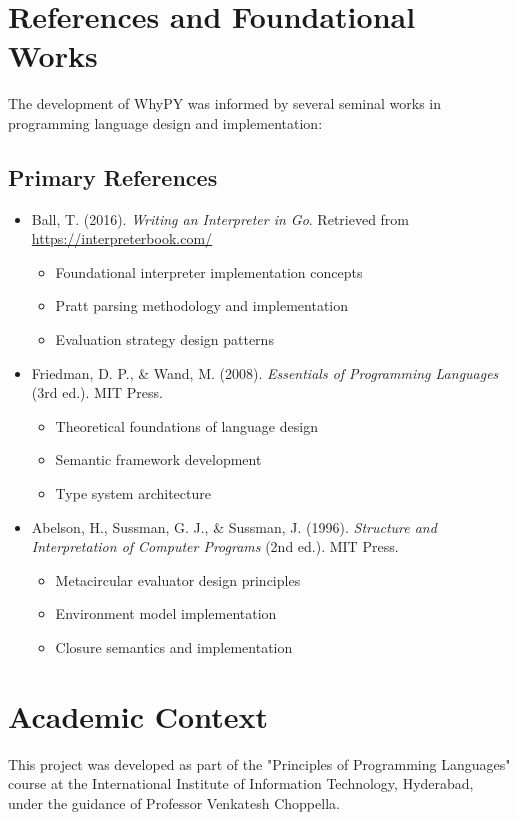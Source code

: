 \documentclass[conference]{IEEEtran}
\begin{document}
\section{References and Foundational Works}
The development of WhyPY was informed by several seminal works in programming language design and implementation:

\subsection{Primary References}
\begin{itemize}
    \item Ball, T. (2016). \textit{Writing an Interpreter in Go}. Retrieved from \url{https://interpreterbook.com/}
    \begin{itemize}
        \item Foundational interpreter implementation concepts
        \item Pratt parsing methodology and implementation
        \item Evaluation strategy design patterns
    \end{itemize}

    \item Friedman, D. P., \& Wand, M. (2008). \textit{Essentials of Programming Languages} (3rd ed.). MIT Press.
    \begin{itemize}
        \item Theoretical foundations of language design
        \item Semantic framework development
        \item Type system architecture
    \end{itemize}

    \item Abelson, H., Sussman, G. J., \& Sussman, J. (1996). \textit{Structure and Interpretation of Computer Programs} (2nd ed.). MIT Press.
    \begin{itemize}
        \item Metacircular evaluator design principles
        \item Environment model implementation
        \item Closure semantics and implementation
    \end{itemize}
\end{itemize}

\section{Academic Context}
This project was developed as part of the "Principles of Programming Languages" course at the International Institute of Information Technology, Hyderabad, under the guidance of Professor Venkatesh Choppella.
\end{document}
